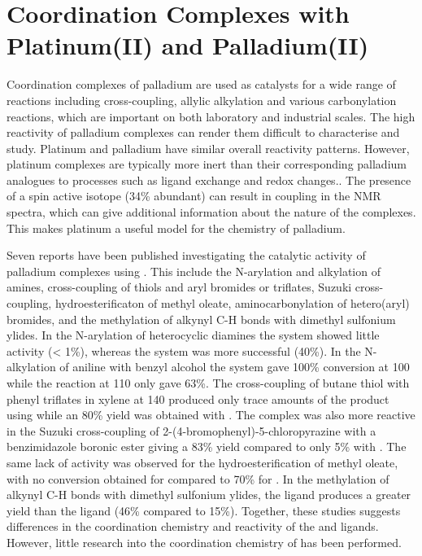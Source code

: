 
\chapter{Coordination Complexes with Platinum(II) and Palladium(II)}
\label{ch:platinumII}

Coordination complexes of palladium are used as catalysts for a wide range of reactions including cross-coupling, allylic alkylation and various carbonylation reactions, which are important on both laboratory and industrial scales.\cite{Dierkes1998, Freixa2003, Nicolaou2005, Peris2004, Shen2008, Suzuki1999, Wu2013, Simeone2010, Trost2012, Wagaw1999}  The high reactivity of palladium complexes can render them difficult to characterise and study.  Platinum and palladium have similar overall reactivity patterns.  However, platinum complexes are typically more inert than their corresponding palladium analogues to processes such as ligand exchange and redox changes.\cite{Chianese2007}.  The presence of a spin active isotope \Pt{} (34\% abundant) can result in coupling in the NMR spectra, which can give additional information about the nature of the complexes.  This makes platinum a useful model for the chemistry of palladium.  

Seven reports have been published investigating the catalytic activity of palladium complexes using \tBuxantphos{}.  This include the N-arylation and alkylation of amines, cross-coupling of thiols and aryl bromides or triflates, Suzuki cross-coupling, hydroesterificaton of methyl oleate, aminocarbonylation of hetero(aryl) bromides, and the methylation of alkynyl C-H bonds with dimethyl sulfonium ylides.\cite{Mispelaere2005, Cabello2007, Ashcroft2013, Behr2013, Friis2014, Dang2013, Liu2013c}  In the N-arylation of heterocyclic diamines the \tBuxantphos{} system showed little activity (\textless{} 1\%), whereas the \Phxantphos{} system was more successful (40\%).\cite{Cabello2007}   In the N-alkylation of aniline with benzyl alcohol the \tBuxantphos{} system gave 100\% conversion at 100\degC{} while the \Phxantphos{} reaction at 110\degC{} only gave 63\%.\cite{Dang2013}  The cross-coupling of butane thiol with phenyl triflates in xylene at 140\degC{} produced only trace amounts of the product using \tBuxantphos{} while an 80\% yield was obtained with \Phxantphos{}.\cite{Mispelaere2005}  The \Phxantphos{} complex was also more reactive in the Suzuki cross-coupling of 2-(4-bromophenyl)-5-chloropyrazine with a benzimidazole boronic ester giving a 83\% yield compared to only 5\% with \tBuxantphos{}.\cite{Ashcroft2013}  The same lack of activity was observed for the hydroesterification of methyl oleate, with no conversion obtained for \tBuxantphos{} compared to 70\% for \Phxantphos{}.  In the methylation of alkynyl C-H bonds with dimethyl sulfonium ylides, the \tBuxantphos{} ligand produces a greater yield than the \Phxantphos{} ligand (46\% compared to 15\%).\cite{Liu2013c}  Together, these studies suggests differences in the coordination chemistry and reactivity of the \tBuxantphos{} and \Phxantphos{} ligands.  However, little research into the coordination chemistry of \tBuxantphos{} has been performed.  

